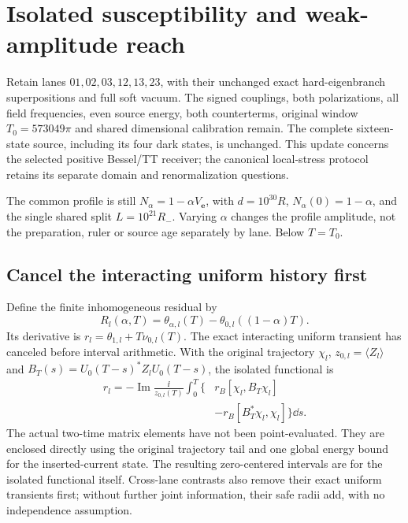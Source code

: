 \section{Isolated susceptibility and weak-amplitude reach}\label{sec:isolated-response-update}
Retain lanes $01,02,03,12,13,23$, with their unchanged exact hard-eigenbranch
superpositions and full soft vacuum. The signed couplings, both polarizations, all field frequencies,
even source energy, both counterterms, original window $T_0=573049\pi$ and
shared dimensional calibration remain. The complete sixteen-state source,
including its four dark states, is unchanged. This update concerns the
selected positive Bessel/TT receiver; the canonical local-stress protocol
retains its separate domain and renormalization questions.

The common profile is still $N_\alpha=1-\alpha V_{\mathbf e}$, with
$d=10^{30}R$, $N_\alpha(0)=1-\alpha$, and the single shared split
$L=10^{21}R_-$. Varying $\alpha$ changes the profile amplitude, not the
preparation, ruler or source age separately by lane. Below $T=T_0$.

\subsection{Cancel the interacting uniform history first}
Define the finite inhomogeneous residual by
\[
 R_l(\alpha,T)=\theta_{\alpha,l}(T)
                   -\theta_{0,l}((1-\alpha)T).
\]
Its derivative is $r_l=\theta_{1,l}+T\nu_{0,l}(T)$. The exact interacting
uniform transient has canceled before interval arithmetic. With the original
trajectory $\chi_l$, $z_{0,l}=\langle Z_l\rangle$ and
$B_T(s)=U_0(T-s)^*Z_lU_0(T-s)$, the isolated functional is
\[
 \begin{aligned}
 r_l=-\operatorname{Im}\frac{\ii}{z_{0,l}(T)}\int_0^T
 \bigl\{&r_B[\chi_l,B_T\chi_l]\\
       &-r_B[B_T^*\chi_l,\chi_l]\bigr\}\dd s.
 \end{aligned}
\]
The actual two-time matrix elements have not been point-evaluated. They are
enclosed directly using the original trajectory tail and one global energy
bound for the inserted-current state. The resulting zero-centered intervals
are for the isolated functional itself. Cross-lane contrasts also remove
their exact uniform transients first; without further joint information,
their safe radii add, with no independence assumption.

